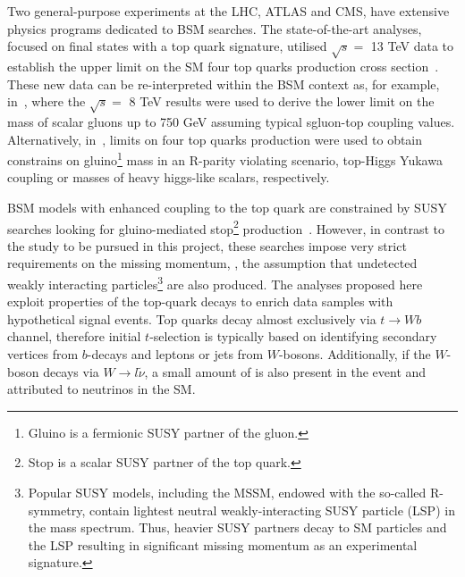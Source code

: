 \textcolor{\mycolor}{
Two general-purpose experiments at the LHC, ATLAS and CMS, have extensive physics programs dedicated to BSM searches. The state-of-the-art analyses, focused on final states with a top quark signature, utilised $\sqrt{s}=$ 13 TeV data to establish the upper limit on the SM four top quarks production cross section~\cite{Aaboud:2017faq,Sirunyan:2017roi,Sirunyan:2017tep}. These new data can be re-interpreted within the BSM context as, for example, in~\cite{Beck:2015cga}, where %
the $\sqrt{s}=$ 8 TeV results were used to derive the lower limit on the mass of scalar gluons up to 750 GeV assuming typical sgluon-top coupling values. Alternatively, in~\cite{Aaboud:2017faq,Sirunyan:2017tep,Cao:2016wib}, limits on four top quarks production were used to obtain constrains on gluino\footnote{Gluino is a fermionic SUSY partner of the gluon.} mass in an R-parity violating scenario, top-Higgs Yukawa coupling or masses of heavy higgs-like scalars, respectively.}

\textcolor{\mycolor}{%
BSM models with enhanced coupling to the top quark are constrained by SUSY searches looking for gluino-mediated stop\footnote{Stop is a scalar SUSY partner of the top quark.} production~\cite{Sirunyan:2017uyt}. However, in contrast to the study to be pursued in this project, these searches impose very strict requirements on the missing momentum, \misspt, the assumption that undetected weakly interacting particles\footnote{Popular SUSY models, including the MSSM, endowed with the so-called R-symmetry, contain lightest neutral weakly-interacting SUSY particle (LSP) in the mass spectrum. Thus, heavier SUSY partners decay to SM particles and the LSP resulting in significant missing momentum as an experimental signature.} are also produced.}
\textcolor{\mycolor}{%
The analyses proposed here exploit properties of the top-quark decays to enrich data samples with hypothetical signal events. Top quarks decay almost exclusively via $t \rightarrow Wb$ channel, therefore initial $t$-selection is typically based on identifying secondary vertices from $b$-decays and leptons or jets from $W$-bosons. Additionally, if the $W$-boson decays via $W\rightarrow l\tilde{\nu}$, a small amount of \misspt is also present in the event and attributed to neutrinos in the SM. }

